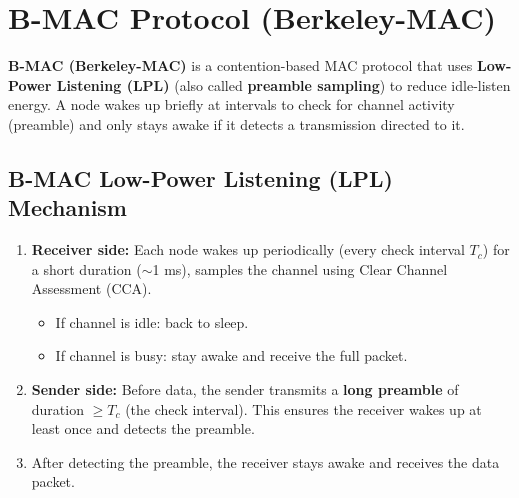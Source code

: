 \documentclass[12pt,a4paper]{article}
\begin{document}
\section{B-MAC Protocol (Berkeley-MAC)}

\begin{tcolorbox}[defbox, title={\textbf{B-MAC --- Definition}}]
\textbf{B-MAC (Berkeley-MAC)} is a contention-based MAC protocol that uses \textbf{Low-Power Listening (LPL)} (also called \textbf{preamble sampling}) to reduce idle-listen energy. A node wakes up briefly at intervals to check for channel activity (preamble) and only stays awake if it detects a transmission directed to it.
\end{tcolorbox}

\subsection{B-MAC Low-Power Listening (LPL) Mechanism}

\begin{enumerate}[leftmargin=*, itemsep=4pt]
  \item \textbf{Receiver side:} Each node wakes up periodically (every check interval $T_c$) for a short duration ($\sim$1 ms), samples the channel using Clear Channel Assessment (CCA).
  \begin{itemize}
    \item If channel is idle: back to sleep.
    \item If channel is busy: stay awake and receive the full packet.
  \end{itemize}
  \item \textbf{Sender side:} Before data, the sender transmits a \textbf{long preamble} of duration $\geq T_c$ (the check interval). This ensures the receiver wakes up at least once and detects the preamble.
  \item After detecting the preamble, the receiver stays awake and receives the data packet.
\end{enumerate}
\end{document}
